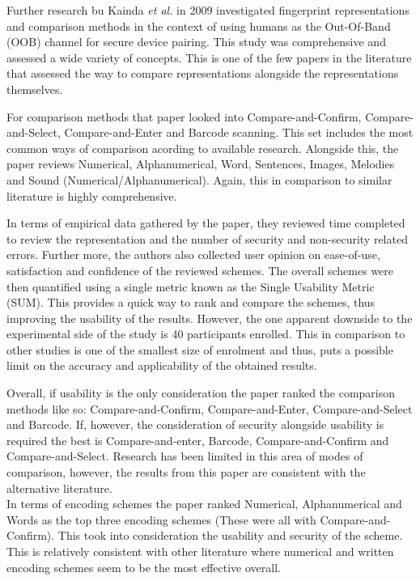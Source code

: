 Further research bu Kainda \textit{et al.}\cite{kainda2009usability} in 2009 investigated fingerprint representations and comparison methods in the context of using humans as the Out-Of-Band (OOB) channel for secure device pairing. This study was comprehensive and assessed a wide variety of concepts. This is one of the few papers in the literature that assessed the way to compare representations alongside the representations themselves.

For comparison methods that paper looked into Compare-and-Confirm, Compare-and-Select, Compare-and-Enter and Barcode scanning. This set includes the most common ways of comparison acording to available research. Alongside this, the paper reviews Numerical, Alphanumerical, Word, Sentences, Images, Melodies and Sound (Numerical/Alphanumerical). Again, this in comparison to similar literature is highly comprehensive.

In terms of empirical data gathered by the paper, they reviewed time completed to review the representation and the number of security and non-security related errors. Further more, the authors also collected user opinion on ease-of-use, satisfaction and confidence of the reviewed schemes. The overall schemes were then quantified using a single metric known as the Single Usability Metric (SUM)\cite{sauro2005method}. This provides a quick way to rank and compare the schemes, thus improving the usability of the results. 
However, the one apparent downside to the experimental side of the study is 40 participants enrolled. This in comparison to other studies is one of the smallest size of enrolment and thus, puts a possible limit on the accuracy and applicability of the obtained results. 

Overall, if usability is the only consideration the paper ranked the comparison methods like so: Compare-and-Confirm, Compare-and-Enter, Compare-and-Select and Barcode. If, however, the consideration of security alongside usability is required the best is Compare-and-enter, Barcode, Compare-and-Confirm and Compare-and-Select. Research has been limited in this area of modes of comparison, however, the results from this paper are consistent with the alternative literature.
\\
In terms of encoding schemes the paper ranked Numerical, Alphanumerical and Words as the top three encoding schemes (These were all with Compare-and-Confirm). This took into consideration the usability and security of the scheme. This is relatively consistent with other literature where numerical and written encoding schemes seem to be the most effective overall.

